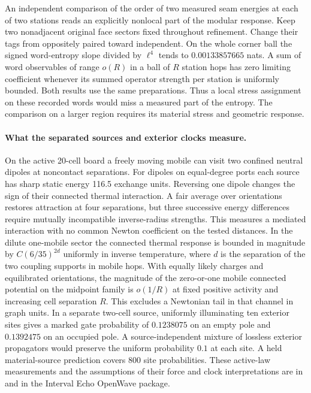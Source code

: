 \documentclass[11pt]{article}
\begin{document}
An independent comparison of the order of two measured seam energies at
each of two stations reads an explicitly nonlocal part of the modular
response. Keep two nonadjacent original face sectors fixed throughout
refinement. Change their tags from oppositely paired toward independent.
On the whole corner ball the signed word-entropy slope divided by
$\ell^4$ tends to $0.00133857665$ nats. A sum of word observables
of range $o(R)$ in a ball of $R$ station hops has zero limiting
coefficient whenever its summed operator strength per station is
uniformly bounded. Both results use the same preparations. Thus a
local stress assignment on these recorded words would miss a measured
part of the entropy. The comparison on a larger region requires its
material stress and geometric response.

\paragraph{What the separated sources and exterior clocks measure.}
On the active 20-cell board a freely moving mobile can visit two confined
neutral dipoles at noncontact separations. For dipoles on equal-degree
ports each source has sharp static energy 116.5 exchange units. Reversing
one dipole changes the sign of their connected thermal interaction.
A fair average over orientations restores attraction at four separations,
but three successive energy differences require mutually incompatible
inverse-radius strengths. This measures a mediated interaction with
no common Newton coefficient on the tested distances. In the dilute
one-mobile sector the connected thermal response is bounded in magnitude
by $C(6/35)^{2d}$ uniformly in inverse temperature, where $d$ is the
separation of the two coupling supports in mobile hops. With equally
likely charges and equilibrated orientations, the magnitude of the
zero-or-one mobile connected potential on the midpoint family is
$o(1/R)$ at fixed positive activity and increasing cell separation $R$.
This excludes a Newtonian tail in that channel in graph units.
In a separate
two-cell source, uniformly illuminating ten exterior sites gives a marked
gate probability of $0.1238075$ on an empty pole and $0.1392475$ on an
occupied pole. A source-independent mixture of lossless exterior
propagators would preserve the uniform probability $0.1$ at each site.
A held material-source prediction covers 800 site probabilities. These
active-law measurements and the assumptions of their force and clock
interpretations are in  and
 in the Interval Echo OpenWave package.
\end{document}
